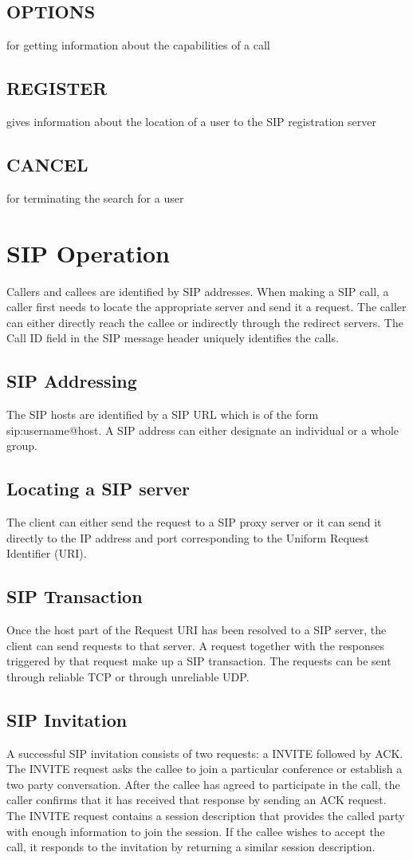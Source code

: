 \documentclass[12pt]{Book}
\begin{document}
    \subsection{OPTIONS}for getting information about the capabilities of a call
    \subsection{REGISTER}gives information about the location of a user to the SIP registration server
    \subsection{CANCEL}for terminating the search for a user
    \section{SIP Operation}
    Callers and callees are identified by SIP addresses. When making a SIP call, a caller first needs to locate
    the appropriate server and send it a request. The caller can either directly reach the callee or indirectly
    through the redirect servers. The Call ID field in the SIP message header uniquely identifies the calls.
    \subsection{SIP Addressing}
    The SIP hosts are identified by a SIP URL which is of the form sip:username@host. A SIP address can
    either designate an individual or a whole group.
    \subsection{Locating a SIP server}
    The client can either send the request to a SIP proxy server or it can send it directly to the IP address and
    port corresponding to the Uniform Request Identifier (URI).
    \subsection{SIP Transaction}
    Once the host part of the Request URI has been resolved to a SIP server, the client can send requests to
    that server. A request together with the responses triggered by that request make up a SIP transaction.
    The requests can be sent through reliable TCP or through unreliable UDP.
    \subsection{SIP Invitation}
    A successful SIP invitation consists of two requests: a INVITE followed by ACK. The INVITE request asks
    the callee to join a particular conference or establish a two party conversation. After the callee has
    agreed to participate in the call, the caller confirms that it has received that response by sending an ACK
    request. The INVITE request contains a session description that provides the called party with enough
    information to join the session. If the callee wishes to accept the call, it responds to the invitation by
    returning a similar session description.
\end{document}
